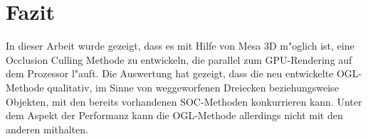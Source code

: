 \documentclass[journal]{vgtc}
\begin{document}
%
%
%
%

\section{Fazit}
In dieser Arbeit wurde gezeigt, dass es mit Hilfe von Mesa 3D m"oglich ist, eine Occlusion Culling Methode zu entwickeln, die parallel zum GPU-Rendering auf dem Prozessor l"auft. Die Auswertung hat gezeigt, dass die neu entwickelte OGL-Methode qualitativ, im Sinne von weggeworfenen Dreiecken beziehungsweise Objekten, mit den bereits vorhandenen SOC-Methoden konkurrieren kann. Unter dem Aspekt der Performanz kann die OGL-Methode allerdings nicht mit den anderen mithalten.  \\
\end{document}
